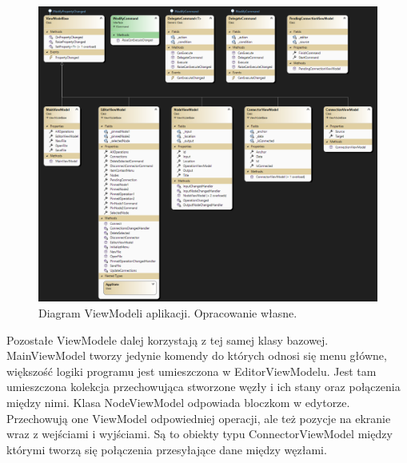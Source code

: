 \begin{figure}[H]
    \centering
    \includegraphics[width=1\linewidth]{images/Picture21.png}
    \caption{Diagram ViewModeli aplikacji. Opracowanie własne.}
    \label{fig:vmDiagEditor}
\end{figure}

Pozostałe ViewModele dalej korzystają z tej samej klasy bazowej.
MainViewModel tworzy jedynie komendy do których odnosi się menu główne, większość logiki programu jest umieszczona w EditorViewModelu.
Jest tam umieszczona kolekcja przechowująca stworzone węzły i ich stany oraz połączenia między nimi.
Klasa NodeViewModel odpowiada bloczkom w edytorze. Przechowują one ViewModel odpowiedniej operacji, ale też pozycje na ekranie wraz z wejściami i wyjściami. 
Są to obiekty typu ConnectorViewModel między którymi tworzą się połączenia przesyłające dane między węzłami. 
